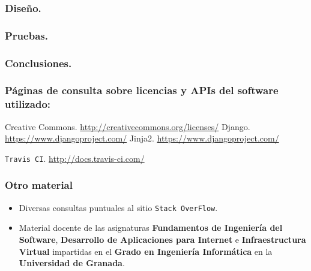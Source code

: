 \subsubsection*{Diseño.}

\subsubsection*{Pruebas.}

\subsubsection*{Conclusiones.}

\subsubsection*{Páginas de consulta sobre licencias y APIs del software utilizado:}
 Creative Commons. \url{http://creativecommons.org/licenses/}
 Django. \url{https://www.djangoproject.com/}
 Jinja2. \url{https://www.djangoproject.com/}

 {\tt Travis CI}. \url{http://docs.travis-ci.com/}

\bigskip


\subsubsection*{Otro material}
\begin{itemize}
	\item Diversas consultas puntuales al sitio {\tt Stack OverFlow}.
	\item Material docente de las asignaturas \textbf{Fundamentos de Ingeniería del Software}, \textbf{Desarrollo de Aplicaciones para Internet} e \textbf{Infraestructura Virtual} impartidas en el \textbf{Grado en Ingeniería Informática} en la \textbf{Universidad de Granada}.
\end{itemize}
